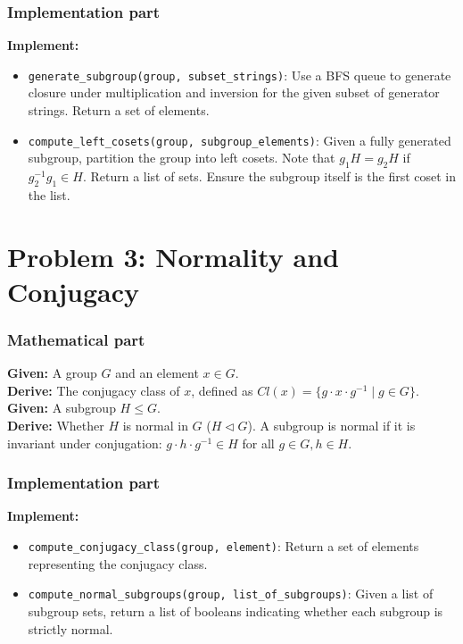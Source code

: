 \documentclass[11pt]{article}
\begin{document}
\subsubsection*{Implementation part}
\textbf{Implement:}
\begin{itemize}
    \item \lstinline|generate_subgroup(group, subset_strings)|: Use a BFS queue to generate closure under multiplication and inversion for the given subset of generator strings. Return a set of elements.
    \item \lstinline|compute_left_cosets(group, subgroup_elements)|: Given a fully generated subgroup, partition the group into left cosets. Note that $g_1 H = g_2 H$ if $g_2^{-1} g_1 \in H$. Return a list of sets. Ensure the subgroup itself is the first coset in the list.
\end{itemize}

\section*{Problem 3: Normality and Conjugacy}

\subsubsection*{Mathematical part}
\textbf{Given:} A group $G$ and an element $x \in G$. \\
\textbf{Derive:} The conjugacy class of $x$, defined as $Cl(x) = \{ g \cdot x \cdot g^{-1} \mid g \in G \}$. \\
\textbf{Given:} A subgroup $H \le G$. \\
\textbf{Derive:} Whether $H$ is normal in $G$ ($H \triangleleft G$). A subgroup is normal if it is invariant under conjugation: $g \cdot h \cdot g^{-1} \in H$ for all $g \in G, h \in H$.

\subsubsection*{Implementation part}
\textbf{Implement:}
\begin{itemize}
    \item \lstinline|compute_conjugacy_class(group, element)|: Return a set of elements representing the conjugacy class.
    \item \lstinline|compute_normal_subgroups(group, list_of_subgroups)|: Given a list of subgroup sets, return a list of booleans indicating whether each subgroup is strictly normal.
\end{itemize}
\end{document}
